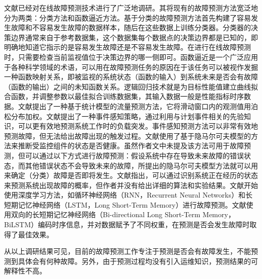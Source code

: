 文献\parencite{salfner2010survey}已经对在线故障预测技术进行了广泛地调研。其将现有的故障预测方法宽泛地分为两类：分类方法和函数逼近方法。基于分类的故障预测方法\cite{tan2012prepare,pitakrat2018hora,zhang2018prefix,baldoni2015line}首先构建了容易发生故障和不容易发生故障的数据样本，随后在这些数据上训练分类器。分类器的决策边界通常来自于参考数据集，这个数据集每个数据点的决策边界都是已知的，即明确地知道它指示的是容易发生故障还是不容易发生故障。在进行在线故障预测时，只需要检查当前监视值位于决策边界的哪一侧即可。函数逼近是一个广泛应用于各种科学领域的术语，可以用在故障预测任务的原因在于该任务可以被视作发掘一种函数映射关系，即被监视的系统状态（函数的输入）到系统未来是否会有故障（函数的输出）之间的未知函数关系。逻辑回归技术就是为目标性能值建立曲线拟合函数，并调整参数以最佳拟合训练数据集，其输入数据一般是性能指标时序数据\cite{salfner2010survey}。文献\parencite{dalmazo2013predicting}提出了一种基于统计模型的流量预测方法，它将滑动窗口内的观测值用泊松分布加权。文献\parencite{sladescu2012event}提出了一种事件感知策略，通过利用与计划事件相关的先验知识，可以更有效地预测系统工作时的负载突发。事件感知预测方法可以非常有效地预测故障，但无法给出故障出现的触发过程。文献\parencite{purushotham2005multi}使用了基于隐马尔可夫模型的方法来推断受监控组件的状态是否健康。虽然作者文中未提及该方法可用于故障预测，但可以通过以下方式进行故障预测：假设系统中存在导致未来故障的错误状态，而其他错误状态不会导致未来的故障，所提出的隐马尔可夫模型方法就可以用来确定（分类）故障是否即将发生。文献\parencite{boutros2011detection}指出，可以通过识别系统正在经历的状态来预测系统出现故障的概率，但作者并没有给出详细的算法和实验结果。文献\parencite{xu2016health,cheng2018machine,du2017deeplog,das2018desh,islam2017predicting,li2020predicting}开始使用深度学习方法，如循环神经网络（RNN，Recurrent Neural Networks）和长短期记忆神经网络（LSTM，Long Short-Term Memory）进行故障预测。文献\parencite{gao2020task}使用双向的长短期记忆神经网络（Bi-directional Long Short-Term Memory，BiLSTM）编码时序信息，并对数据赋予了不同权重，在预测是否会发生故障时取得了最佳效果。

从以上调研结果可见，目前的故障预测工作专注于预测是否会有故障发生，不能预测到具体会有何种故障。另外，由于预测过程均没有引入运维知识，预测结果的可解释性不高。

